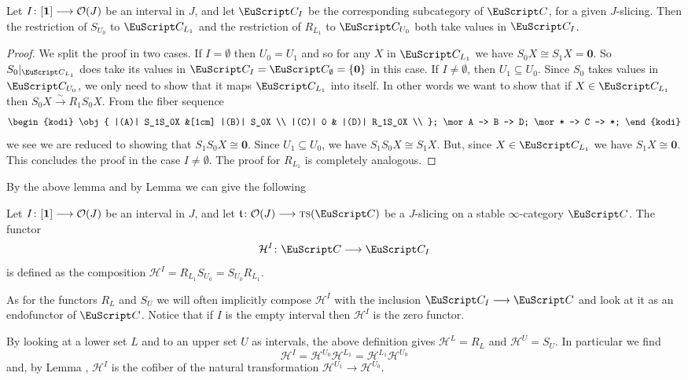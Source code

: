 \begin{lemma}
Let $I\colon[\mathbf{1}] \longrightarrow \mathcal{O}(J)$ be an interval in $J$, and let $\C_I$ be the corresponding subcategory of $\C$, for a given $J$-slicing. Then the restriction of $S_{U_0}$ to $\C_{L_1}$ and the restriction of $R_{L_1}$ to $\C_{U_0}$ both take values in $\C_I$. 
\end{lemma}
\begin{proof}
We split the proof in two cases. If $I=\emptyset$ then $U_0=U_1$ and so for any $X$ in $\C_{L_1}$ we have $S_0X\cong S_1X=\mathbf{0}$. So $S_{0}\vert_{\C_{L_1}}$ does take its values in $\C_I=\C_\emptyset=\{\mathbf{0}\}$ in this case. If $I\neq \emptyset$, then $U_1\subseteq U_0$. Since $S_{0}$ takes values in $\C_{U_0}$, we only need to show that it maps $\C_{L_1}$ into itself. In other words we want to show that if $X\in \C_{L_1}$ then $S_0X\xrightarrow{\sim} R_1S_0X$. From the fiber sequence 
\[
\begin{kodi}
\obj{
|(A)| S_1S_0X &[1cm] |(B)| S_0X  \\
|(C)| 0 & |(D)| R_1S_0X  \\
};
\mor A -> B -> D;
\mor * -> C -> *;
\end{kodi}
\]
we see we are reduced to showing that $S_1S_0X\cong \mathbf{0}$. Since $U_1\subseteq U_0$, we have $S_1S_0X\cong S_1X$. But, since $X\in \C_{L_1}$ we have $S_1X\cong \mathbf{0}$. This concludes the proof in the case $I\neq \emptyset$. The proof for $R_{L_1}$ is completely analogous.
\end{proof}
By the above lemma and by Lemma  we can give the following
\begin{definition}\label{def.homology}
Let $I\colon[\mathbf{1}] \longrightarrow \mathcal{O}(J)$ be an interval in $J$, and let $\tee\colon \O(J)\to \ts(\C)$ be a $J$-slicing on a stable $\infty$-category $\C$. The functor
\[
\mathcal{H}^I\colon \C\to \C_I
\]
is defined as the composition $\mathcal{H}^I=R_{L_1}S_{U_0}=S_{U_0}R_{L_1}$. 
\end{definition}
As for the functors $R_L$ and $S_U$ we will often implicitly compose $\mathcal{H}^I$ with the inclusion $\C_I\to \C$ and look at it as an endofunctor of $\C$. Notice that if $I$ is the empty interval then $\mathcal{H}^I$ is the zero functor.
\begin{remark}\label{rem.questo}
By looking at a lower set $L$ and to an upper set $U$ as intervals, the above definition gives $\mathcal{H}^L=R_L$ and $\mathcal{H}^U=S_U$. In particular we find
\[
\mathcal{H}^I=\mathcal{H}^{U_0}\mathcal{H}^{L_1}=\mathcal{H}^{L_1}\mathcal{H}^{U_0}
\]
and, by Lemma ,  $\mathcal{H}^I$ is the cofiber of the natural transformation $\mathcal{H}^{U_1}\to \mathcal{H}^{U_0}$.
\end{remark}
